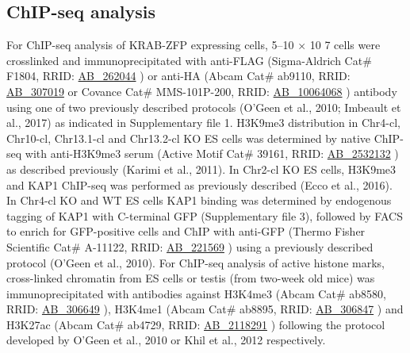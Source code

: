 \documentclass[11pt,a4paper]{article}
\begin{document}
\subsection{ChIP-seq analysis}

For ChIP-seq analysis of KRAB-ZFP expressing cells, 5–10 × 10 7 cells were crosslinked and immunoprecipitated with anti-FLAG (Sigma-Aldrich Cat\# F1804, RRID: \href{https://scicrunch.org/resolver/AB\_262044}{AB\_262044} ) or anti-HA (Abcam Cat\# ab9110, RRID: \href{https://scicrunch.org/resolver/AB\_307019}{AB\_307019} or Covance Cat\# MMS-101P-200, RRID: \href{https://scicrunch.org/resolver/AB\_10064068}{AB\_10064068} ) antibody using one of two previously described protocols (O'Geen et al., 2010; Imbeault et al., 2017) as indicated in Supplementary file 1. H3K9me3 distribution in Chr4-cl, Chr10-cl, Chr13.1-cl and Chr13.2-cl KO ES cells was determined by native ChIP-seq with anti-H3K9me3 serum (Active Motif Cat\# 39161, RRID: \href{https://scicrunch.org/resolver/AB\_2532132}{AB\_2532132} ) as described previously (Karimi et al., 2011). In Chr2-cl KO ES cells, H3K9me3 and KAP1 ChIP-seq was performed as previously described (Ecco et al., 2016). In Chr4-cl KO and WT ES cells KAP1 binding was determined by endogenous tagging of KAP1 with C-terminal GFP (Supplementary file 3), followed by FACS to enrich for GFP-positive cells and ChIP with anti-GFP (Thermo Fisher Scientific Cat\# A-11122, RRID: \href{https://scicrunch.org/resolver/AB\_221569}{AB\_221569} ) using a previously described protocol (O'Geen et al., 2010). For ChIP-seq analysis of active histone marks, cross-linked chromatin from ES cells or testis (from two-week old mice) was immunoprecipitated with antibodies against H3K4me3 (Abcam Cat\# ab8580, RRID: \href{https://scicrunch.org/resolver/AB\_306649}{AB\_306649} ), H3K4me1 (Abcam Cat\# ab8895, RRID: \href{https://scicrunch.org/resolver/AB\_306847}{AB\_306847} ) and H3K27ac (Abcam Cat\# ab4729, RRID: \href{https://scicrunch.org/resolver/AB\_2118291}{AB\_2118291} ) following the protocol developed by O'Geen et al., 2010 or Khil et al., 2012 respectively.
\end{document}

